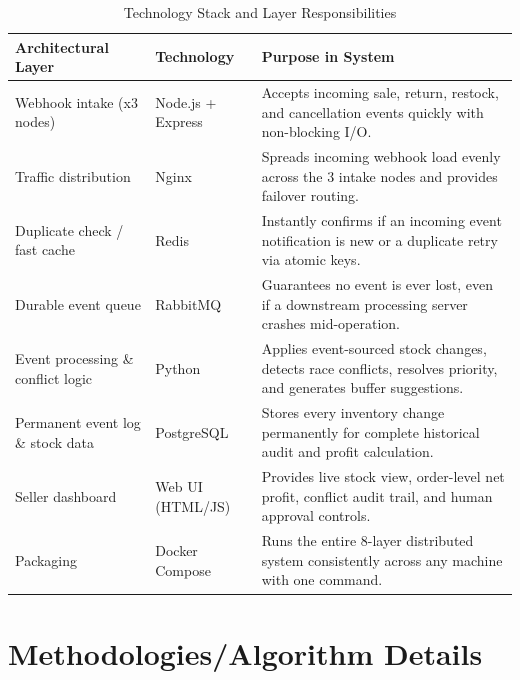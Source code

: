 \documentclass[oneside,a4paper,12pt]{report}
\begin{document}
\begin{table}[!htbp]
\centering
\renewcommand{\arraystretch}{1.4}
\begin{tabularx}{\textwidth}{|p{4.0cm}|p{3.6cm}|X|}
\hline
\textbf{Architectural Layer} & \textbf{Technology} & \textbf{Purpose in System} \\ \hline
Webhook intake (x3 nodes) & Node.js + Express & Accepts incoming sale, return, restock, and cancellation events quickly with non-blocking I/O. \\ \hline
Traffic distribution & Nginx & Spreads incoming webhook load evenly across the 3 intake nodes and provides failover routing. \\ \hline
Duplicate check / fast cache & Redis & Instantly confirms if an incoming event notification is new or a duplicate retry via atomic keys. \\ \hline
Durable event queue & RabbitMQ & Guarantees no event is ever lost, even if a downstream processing server crashes mid-operation. \\ \hline
Event processing \& conflict logic & Python & Applies event-sourced stock changes, detects race conflicts, resolves priority, and generates buffer suggestions. \\ \hline
Permanent event log \& stock data & PostgreSQL & Stores every inventory change permanently for complete historical audit and profit calculation. \\ \hline
Seller dashboard & Web UI (HTML/JS) & Provides live stock view, order-level net profit, conflict audit trail, and human approval controls. \\ \hline
Packaging & Docker Compose & Runs the entire 8-layer distributed system consistently across any machine with one command. \\ \hline
\end{tabularx}
\caption{Technology Stack and Layer Responsibilities}
\label{tab:tech_stack}
\end{table}

\section{Methodologies/Algorithm Details}
\end{document}
